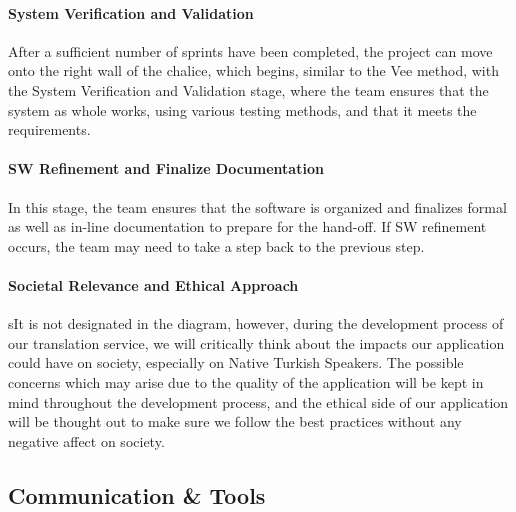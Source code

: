 %
%
%


\paragraph*{System Verification and Validation}
After a sufficient number of sprints have been completed, the project can move onto the right wall of the chalice, which begins, similar to the Vee method, with the System Verification and Validation stage, where the team ensures that the system as whole works, using various testing methods, and that it meets the requirements.

\paragraph*{SW Refinement and Finalize Documentation}
In this stage, the team ensures that the software is organized and finalizes formal as well as in-line documentation to prepare for the hand-off. If SW refinement occurs, the team may need to take a step back to the previous step.

\paragraph*{Societal Relevance and Ethical Approach}
sIt is not designated in the diagram, however, during the development process of our translation service, we will critically think about the impacts our application could have on society, especially on Native Turkish Speakers. The possible concerns which may arise due to the quality of the application will be kept in mind throughout the development process, and the ethical side of our application will be thought out to make sure we follow the best practices without any negative affect on society. 

\subsection{Communication \& Tools}

